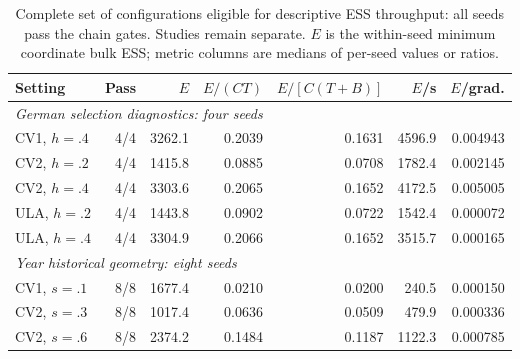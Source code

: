 \begin{table}[tb]
\centering\small
\caption{Complete set of configurations eligible for descriptive ESS throughput: all seeds pass the chain gates. Studies remain separate. $E$ is the within-seed minimum coordinate bulk ESS; metric columns are medians of per-seed values or ratios.}\label{tab:ess_eligible}
\setlength{\tabcolsep}{4pt}
\begin{tabular}{lrrrrrr}
\toprule
Setting & Pass & $E$ & $E/(CT)$ & $E/[C(T+B)]$ & $E$/s & $E$/grad. \\
\midrule
\multicolumn{7}{l}{\textit{German selection diagnostics: four seeds}} \\
CV1, $h=.4$ & 4/4 & 3262.1 & 0.2039 & 0.1631 & 4596.9 & 0.004943 \\
CV2, $h=.2$ & 4/4 & 1415.8 & 0.0885 & 0.0708 & 1782.4 & 0.002145 \\
CV2, $h=.4$ & 4/4 & 3303.6 & 0.2065 & 0.1652 & 4172.5 & 0.005005 \\
ULA, $h=.2$ & 4/4 & 1443.8 & 0.0902 & 0.0722 & 1542.4 & 0.000072 \\
ULA, $h=.4$ & 4/4 & 3304.9 & 0.2066 & 0.1652 & 3515.7 & 0.000165 \\
\multicolumn{7}{l}{\textit{Year historical geometry: eight seeds}} \\
CV1, $s=.1$ & 8/8 & 1677.4 & 0.0210 & 0.0200 & 240.5 & 0.000150 \\
CV2, $s=.3$ & 8/8 & 1017.4 & 0.0636 & 0.0509 & 479.9 & 0.000336 \\
CV2, $s=.6$ & 8/8 & 2374.2 & 0.1484 & 0.1187 & 1122.3 & 0.000785 \\
\bottomrule
\end{tabular}
\par{}
\end{table}
